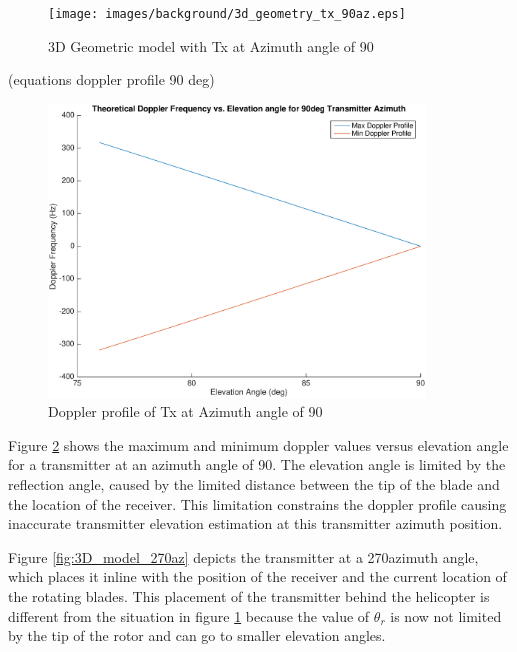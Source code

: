 \begin{figure}
	\begin{center}
		\texttt{[image: images/background/3d\_geometry\_tx\_90az.eps]}
		\caption{3D Geometric model with Tx at Azimuth angle of 90\textdegree}
		\label{fig:3D_model_90az}
	\end{center}
\end{figure}

(equations doppler profile 90 deg)

\begin{figure}
	\begin{center}
		\includegraphics[width=10cm]{images/background/3d_geometry_tx_90az_doppler_profile.eps}
		\caption{Doppler profile of Tx at Azimuth angle of 90\textdegree}
		\label{fig:3D_model_90az_doppler}
	\end{center}
\end{figure}

Figure \ref{fig:3D_model_90az_doppler} shows the maximum and minimum doppler values versus elevation angle for a transmitter at an azimuth angle of 90\textdegree. The elevation angle is limited by the reflection angle, caused by the limited distance between the tip of the blade and the location of the receiver. This limitation constrains the doppler profile causing inaccurate transmitter elevation estimation at this transmitter azimuth position.

Figure \ref{fig:3D_model_270az} depicts the transmitter at a 270\textdegree \space azimuth angle, which places it inline with the position of the receiver and the current location of the rotating blades. This placement of the transmitter behind the helicopter is different from the situation in figure \ref{fig:3D_model_90az} because the value of $\theta_r$ is now not limited by the tip of the rotor and can go to smaller elevation angles.

